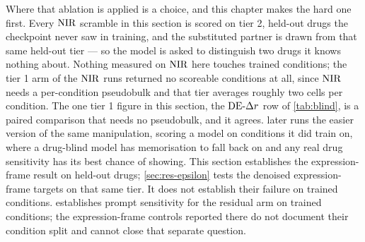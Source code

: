 Where that ablation is applied is a choice, and this chapter makes the hard one
first. Every $\textrm{NIR}$ scramble in this section is scored on tier 2, held-out drugs the checkpoint never saw in training, and the substituted partner is drawn from that same held-out tier --- so the model is asked to distinguish two drugs it knows nothing about. Nothing measured on $\textrm{NIR}$ here touches trained conditions; the tier 1 arm of the $\textrm{NIR}$ runs returned no scoreable conditions at all, since $\textrm{NIR}$ needs a per-condition pseudobulk and that tier averages roughly two cells per condition. The one tier 1 figure in this section, the $\textrm{DE-}\Delta r$ row of \cref{tab:blind}, is a paired comparison that needs no pseudobulk, and it agrees.  later runs the easier version of the same
manipulation, scoring a model on conditions it did train on, where a drug-blind
model has memorisation to fall back on and any real drug sensitivity has its
best chance of showing. This section establishes the expression-frame result
on held-out drugs; \cref{sec:res-epsilon} tests the denoised expression-frame
targets on that same tier. It does not establish their failure on trained
conditions.  establishes prompt sensitivity for the
residual arm on trained conditions; the expression-frame controls reported
there do not document their condition split and cannot close that separate
question.

